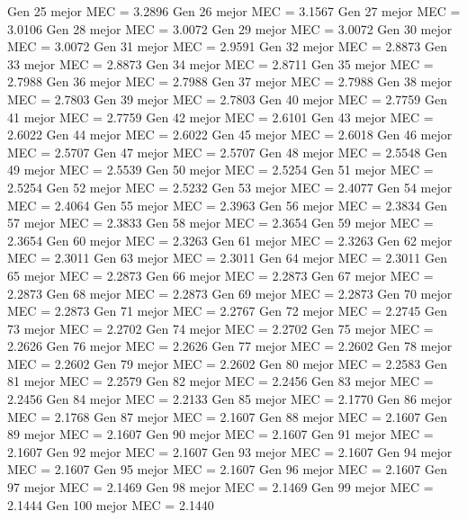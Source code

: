 Gen 25 mejor MEC = 3.2896
Gen 26 mejor MEC = 3.1567
Gen 27 mejor MEC = 3.0106
Gen 28 mejor MEC = 3.0072
Gen 29 mejor MEC = 3.0072
Gen 30 mejor MEC = 3.0072
Gen 31 mejor MEC = 2.9591
Gen 32 mejor MEC = 2.8873
Gen 33 mejor MEC = 2.8873
Gen 34 mejor MEC = 2.8711
Gen 35 mejor MEC = 2.7988
Gen 36 mejor MEC = 2.7988
Gen 37 mejor MEC = 2.7988
Gen 38 mejor MEC = 2.7803
Gen 39 mejor MEC = 2.7803
Gen 40 mejor MEC = 2.7759
Gen 41 mejor MEC = 2.7759
Gen 42 mejor MEC = 2.6101
Gen 43 mejor MEC = 2.6022
Gen 44 mejor MEC = 2.6022
Gen 45 mejor MEC = 2.6018
Gen 46 mejor MEC = 2.5707
Gen 47 mejor MEC = 2.5707
Gen 48 mejor MEC = 2.5548
Gen 49 mejor MEC = 2.5539
Gen 50 mejor MEC = 2.5254
Gen 51 mejor MEC = 2.5254
Gen 52 mejor MEC = 2.5232
Gen 53 mejor MEC = 2.4077
Gen 54 mejor MEC = 2.4064
Gen 55 mejor MEC = 2.3963
Gen 56 mejor MEC = 2.3834
Gen 57 mejor MEC = 2.3833
Gen 58 mejor MEC = 2.3654
Gen 59 mejor MEC = 2.3654
Gen 60 mejor MEC = 2.3263
Gen 61 mejor MEC = 2.3263
Gen 62 mejor MEC = 2.3011
Gen 63 mejor MEC = 2.3011
Gen 64 mejor MEC = 2.3011
Gen 65 mejor MEC = 2.2873
Gen 66 mejor MEC = 2.2873
Gen 67 mejor MEC = 2.2873
Gen 68 mejor MEC = 2.2873
Gen 69 mejor MEC = 2.2873
Gen 70 mejor MEC = 2.2873
Gen 71 mejor MEC = 2.2767
Gen 72 mejor MEC = 2.2745
Gen 73 mejor MEC = 2.2702
Gen 74 mejor MEC = 2.2702
Gen 75 mejor MEC = 2.2626
Gen 76 mejor MEC = 2.2626
Gen 77 mejor MEC = 2.2602
Gen 78 mejor MEC = 2.2602
Gen 79 mejor MEC = 2.2602
Gen 80 mejor MEC = 2.2583
Gen 81 mejor MEC = 2.2579
Gen 82 mejor MEC = 2.2456
Gen 83 mejor MEC = 2.2456
Gen 84 mejor MEC = 2.2133
Gen 85 mejor MEC = 2.1770
Gen 86 mejor MEC = 2.1768
Gen 87 mejor MEC = 2.1607
Gen 88 mejor MEC = 2.1607
Gen 89 mejor MEC = 2.1607
Gen 90 mejor MEC = 2.1607
Gen 91 mejor MEC = 2.1607
Gen 92 mejor MEC = 2.1607
Gen 93 mejor MEC = 2.1607
Gen 94 mejor MEC = 2.1607
Gen 95 mejor MEC = 2.1607
Gen 96 mejor MEC = 2.1607
Gen 97 mejor MEC = 2.1469
Gen 98 mejor MEC = 2.1469
Gen 99 mejor MEC = 2.1444
Gen 100 mejor MEC = 2.1440

